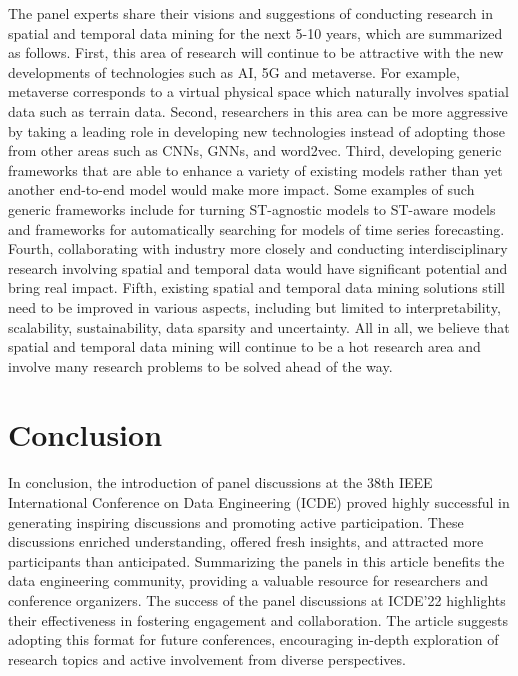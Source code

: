 \documentclass[11pt,dvipdfm]{article}
\begin{document}
The panel experts share their visions and suggestions of conducting research in spatial and temporal data mining for the next 5-10 years, which are summarized as follows. First, this area of research will continue to be attractive with the new developments of technologies such as AI, 5G and metaverse. For example, metaverse corresponds to a virtual physical space which naturally involves spatial data such as terrain data. Second, researchers in this area can be more aggressive by taking a leading role in developing new technologies instead of adopting those from other areas such as CNNs, GNNs, and word2vec. Third, developing generic frameworks that are able to enhance a variety of existing models rather than yet another end-to-end model would make more impact. Some examples of such generic frameworks include for turning ST-agnostic models to ST-aware models and \cite{STM13, STM14} frameworks for automatically searching for models of time series forecasting. Fourth, collaborating with industry more closely and conducting interdisciplinary research involving spatial and temporal data would have significant potential and bring real impact. Fifth, existing spatial and temporal data mining solutions still need to be improved in various aspects, including but limited to interpretability, scalability, sustainability, data sparsity and uncertainty. All in all, we believe that spatial and temporal data mining will continue to be a hot research area and involve many research problems to be solved ahead of the way.


\section{Conclusion}

In conclusion, the introduction of panel discussions at the 38th IEEE International Conference on Data Engineering (ICDE) proved highly successful in generating inspiring discussions and promoting active participation. These discussions enriched understanding, offered fresh insights, and attracted more participants than anticipated. Summarizing the panels in this article benefits the data engineering community, providing a valuable resource for researchers and conference organizers. The success of the panel discussions at ICDE'22 highlights their effectiveness in fostering engagement and collaboration. The article suggests adopting this format for future conferences, encouraging in-depth exploration of research topics and active involvement from diverse perspectives.
\end{document}
